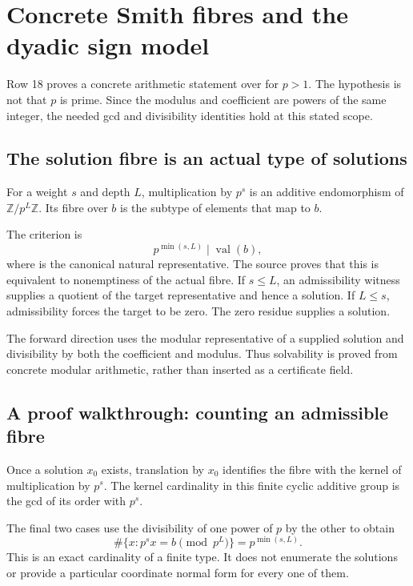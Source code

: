 \section{Concrete Smith fibres and the dyadic sign model}\label{sec:smith}

Row 18 proves a concrete arithmetic statement over  for $p>1$. The hypothesis is not that $p$ is prime. Since the modulus and coefficient are powers of the same integer, the needed gcd and divisibility identities hold at this stated scope.

\subsection{The solution fibre is an actual type of solutions}

For a weight $s$ and depth $L$, multiplication by $p^s$ is an additive endomorphism of $\mathbb Z/p^L\mathbb Z$. Its fibre over $b$ is the subtype of elements that map to $b$.

The criterion is
\[
p^{\min(s,L)}\mid\operatorname{val}(b),
\]
where  is the canonical natural representative. The source proves that this is equivalent to nonemptiness of the actual fibre. If $s\le L$, an admissibility witness supplies a quotient of the target representative and hence a solution. If $L\le s$, admissibility forces the target to be zero. The zero residue supplies a solution.

The forward direction uses the modular representative of a supplied solution and divisibility by both the coefficient and modulus. Thus solvability is proved from concrete modular arithmetic, rather than inserted as a certificate field.

\subsection{A proof walkthrough: counting an admissible fibre}

Once a solution $x_0$ exists, translation by $x_0$ identifies the fibre with the kernel of multiplication by $p^s$. The kernel cardinality in this finite cyclic additive group is the gcd of its order with $p^s$.

The final two cases use the divisibility of one power of $p$ by the other to obtain
\[
\#\{x:p^sx=b\pmod {p^L}\}=p^{\min(s,L)}.
\]
This is an exact cardinality of a finite type. It does not enumerate the solutions or provide a particular coordinate normal form for every one of them.

